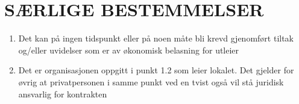 \section{SÆRLIGE BESTEMMELSER}


    \begin{enumerate}


        \item Det kan på ingen tidspunkt eller på noen måte bli krevd gjenomført tiltak og/eller uvidelser som er av økonomisk belasning for utleier


        \item Det er organisasjonen oppgitt i punkt 1.2 som leier lokalet. Det gjelder for øvrig at privatpersonen i samme punkt ved en tvist også vil stå juridisk ansvarlig for kontrakten


    \end{enumerate}
